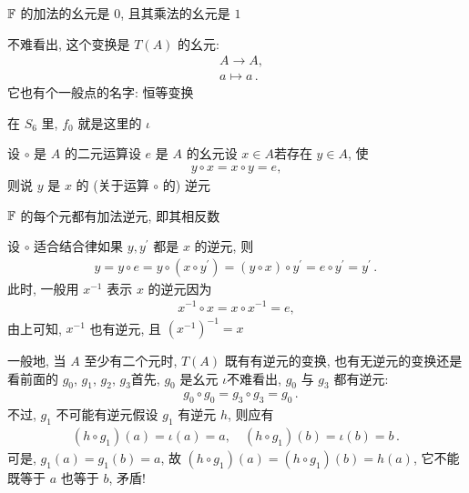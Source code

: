 \begin{example}
    $\mathbb{F}$ 的加法的幺元是 $0$, 且其乘法的幺元是 $1$\period
\end{example}

\begin{example}
    不难看出, 这个变换是 $T(A)$ 的幺元:
    \begin{align*}
         & A \to A,  \tag*{$\iota$:} \\
         & a \mapsto a \period
    \end{align*}
    它也有个一般点的名字: 恒等变换 \period

    在 $S_6$ 里, $f_0$ 就是这里的 $\iota$\period
\end{example}

\begin{definition}
    设 $\circ$ 是 $A$ 的二元运算\period 设 $e$ 是 $A$ 的幺元\period 设 $x \in A$\period 若存在 $y \in A$, 使
    \begin{align*}
        y \circ x = x \circ y = e,
    \end{align*}
    则说 $y$ 是 $x$ 的 (关于运算 $\circ$ 的) 逆元 \period
\end{definition}

\begin{example}
    $\mathbb{F}$ 的每个元都有加法逆元, 即其相反数\period
\end{example}

\begin{remark}
    设 $\circ$ 适合结合律\period 如果 $y, y^{\prime}$ 都是 $x$ 的逆元, 则
    \begin{align*}
        y = y \circ e = y \circ (x \circ y^{\prime}) = (y \circ x) \circ y^{\prime} = e \circ y^{\prime} = y^{\prime} \period
    \end{align*}
    此时, 一般用 $x^{-1}$ 表示 $x$ 的逆元\period 因为
    \begin{align*}
        x^{-1} \circ x = x \circ x^{-1} = e,
    \end{align*}
    由上可知, $x^{-1}$ 也有逆元, 且 $(x^{-1})^{-1} = x$\period
\end{remark}

\begin{example}
    一般地, 当 $A$ 至少有二个元时, $T(A)$ 既有有逆元的变换, 也有无逆元的变换\period 还是看前面的 $g_0$, $g_1$, $g_2$, $g_3$\period 首先, $g_0$ 是幺元 $\iota$\period 不难看出, $g_0$ 与 $g_3$ 都有逆元:
    \begin{align*}
         & g_0 \circ g_0 = g_3 \circ g_3 = g_0 \period
    \end{align*}
    不过, $g_1$ 不可能有逆元\period 假设 $g_1$ 有逆元 $h$, 则应有
    \begin{align*}
        (h \circ g_1)(a) = \iota(a) = a, \quad (h \circ g_1)(b) = \iota(b) = b \period
    \end{align*}
    可是, $g_1(a) = g_1(b) = a$, 故 $(h \circ g_1)(a) = (h \circ g_1)(b) = h(a)$, 它不能既等于 $a$ 也等于 $b$, 矛盾!
\end{example}


